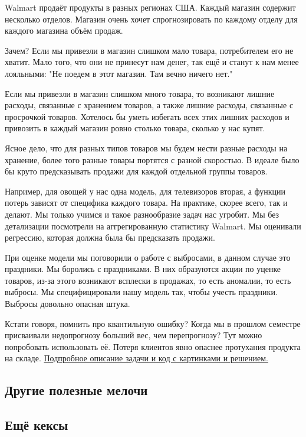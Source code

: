 \documentclass[12pt, a4paper, oneside]{article}
\begin{document}
Walmart продаёт продукты в разных регионах США. Каждый магазин содержит несколько отделов. Магазин очень хочет спрогнозировать по каждому отделу для каждого магазина объём продаж. 

Зачем? Если мы привезли в магазин слишком мало товара, потребителем его не хватит. Мало того, что они не принесут нам денег, так ещё и станут к нам менее лояльными: "Не поедем в этот магазин. Там вечно ничего нет."

Если мы привезли в магазин слишком много товара, то возникают лишние расходы, связанные с хранением товаров, а также лишние расходы, связанные с просрочкой товаров.
Хотелось бы уметь избегать всех этих лишних расходов и привозить в каждый магазин ровно столько товара, сколько у нас купят. 

Ясное дело, что для разных типов товаров мы будем нести разные расходы на хранение, более того разные товары портятся с разной скоростью. В идеале было бы круто предсказывать продажи для каждой отдельной группы товаров.

Например, для овощей у нас одна модель, для телевизоров вторая, а функции потерь зависят от специфика каждого товара. На практике, скорее всего, так и делают. Мы только учимся и такое разнообразие задач нас угробит. Мы без детализации посмотрели на аггрегированную статистику Walmart. Мы оценивали регрессию, которая должна была бы предсказать продажи. 

При оценке модели мы поговорили о работе с выбросами, в данном случае это праздники. Мы боролись с праздниками. В них образуются акции по уценке товаров, из-за этого возникают всплески в продажах, то есть аномалии, то есть выбросы. Мы специфицировали нашу модель так, чтобы учесть праздники.  Выбросы довольно опасная штука. 

Кстати говоря, помнить про квантильную ошибку? Когда мы в прошлом семестре присваивали недопрогнозу больший вес, чем перепрогнозу? Тут можно попробовать использовать её. Потеря клиентов явно опаснее протухания продукта на складе. \href{http://nbviewer.jupyter.org/github/FUlyankin/HSE_Data_Culture/blob/master/ML%20for%20marketing%202018%20autumn/sem_67/3.1%20Продажи%20и%20линейная%20регрессия..ipynb}{Подпробное описание задачи и код с картинками и решением.} 


\subsection*{Другие полезные мелочи}

\subsection*{Ещё кексы} 
\end{document}
